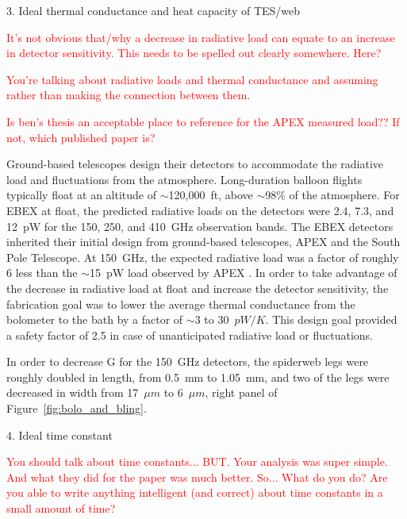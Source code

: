 3. Ideal thermal conductance and heat capacity of TES/web 

\textcolor{red}{It's not obvious that/why a decrease in radiative load can equate to an increase in detector sensitivity. This needs to be spelled out clearly somewhere. Here?}

\textcolor{red}{You're talking about radiative loads and thermal conductance and assuming rather than making the connection between them.}

\textcolor{red}{%
Is ben's thesis an acceptable place to reference for the APEX measured load?? If not, which published paper is?}

Ground-based telescopes design their detectors to accommodate the radiative load and fluctuations from the atmosphere. 
Long-duration balloon flights typically float at an altitude of $\sim$120,000~ft, above $\sim$98\% of the atmosphere. 
For \ac{EBEX} at float, the predicted radiative loads on the detectors were 2.4, 7.3, and 12~pW for the 150, 250, and 410~GHz observation bands. 
The \ac{EBEX} detectors inherited their initial design from ground-based telescopes, \ac{APEX} and the South Pole Telescope. 
At 150~GHz, the expected radiative load was a factor of roughly 6 less than the $\sim$15~pW load observed by \ac{APEX} \cite{Westbrook2014}. 
In order to take advantage of the decrease in radiative load at float and increase the detector sensitivity, the fabrication goal was to lower the average thermal conductance from the bolometer to the bath by a factor of $\sim$3 to 30~$pW/K$. 
This design goal provided a safety factor of 2.5 in case of unanticipated radiative load or fluctuations.

In order to decrease G for the 150~GHz detectors, the spiderweb legs were roughly doubled in length, from 0.5~mm to 1.05~mm, and two of the legs were decreased in width from 17~$\mu m$ to 6~$\mu m$, right panel of Figure~\ref{fig:bolo_and_bling}. 



4. Ideal time constant

\textcolor{red}{You should talk about time constants... BUT. Your analysis was super simple. And what they did for the paper was much better. So... What do you do? Are you able to write anything intelligent (and correct) about time constants in a small amount of time?}

